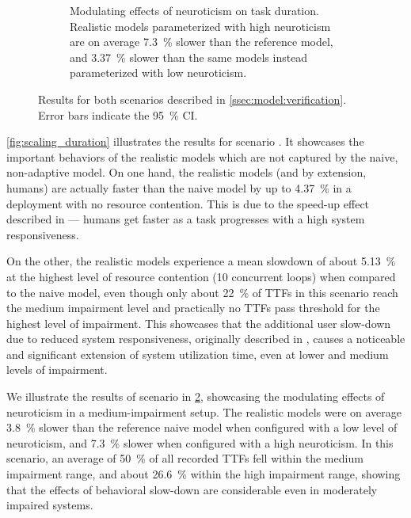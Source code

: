 \begin{figure}
\begin{subfigure}[t]{\columnwidth}
        \caption{%
            Modulating effects of neuroticism on task duration.
            Realistic models parameterized with high neuroticism are on average \SI{7.3}{\percent} slower than the reference model, and \SI{3.37}{\percent} slower than the same models instead parameterized with low neuroticism.
        }\label{fig:neuro_duration}
    \end{subfigure}%
    \caption{Results for both scenarios described in \cref{ssec:model:verification}. Error bars indicate the \SI{95}{\percent} \ac{CI}.}
\end{figure}

\cref{fig:scaling_duration} illustrates the results for scenario .
It showcases the important behaviors of the realistic models which are not captured by the naive, non-adaptive model.
On one hand, the realistic models (and by extension, humans) are actually faster than the naive model by up to \SI{4.37}{\percent} in a deployment with no resource contention.
This is due to the speed-up effect described in \textcite{olguinmunoz:impact2021} --- humans get faster as a task progresses with a high system responsiveness.

On the other, the realistic models experience a mean slowdown of about \SI{5.13}{\percent} at the highest level of resource contention (\num{10} concurrent loops) when compared to the naive model, even though only about \SI{22}{\percent} of \acp{TTF} in this scenario reach the medium impairment level and practically no \acp{TTF} pass threshold for the highest level of impairment.
This showcases that the additional user slow-down due to reduced system responsiveness, originally described in \textcite{olguinmunoz:impact2021}, causes a noticeable and significant extension of system utilization time, even at lower and medium levels of impairment.

\medskip

We illustrate the results of scenario  in \cref{fig:neuro_duration}, showcasing the modulating effects of neuroticism in a medium-impairment setup.
The realistic models were on average \SI{3.8}{\percent} slower than the reference naive model when configured with a low level of neuroticism, and \SI{7.3}{\percent} slower when configured with a high neuroticism.
In this scenario, an average of \SI{50}{\percent} of all recorded \acp{TTF} fell within the medium impairment range, and about \SI{26.6}{\percent} within the high impairment range, showing that the effects of behavioral slow-down are considerable even in moderately impaired systems. 

